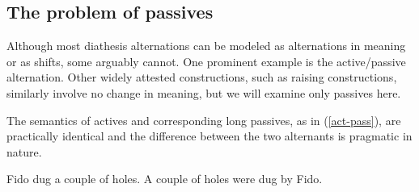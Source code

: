 \documentclass[output=paper
 	        ,biblatex
                ,babelshorthands
                ,newtxmath
                ,draftmode
                ,colorlinks, citecolor=brown
]{langscibook}
\begin{document}
\begin{exe}
	\ex\label{carve-sem}
	\begin{xlist}
	\ex \label{carve-sem-a}
\ex \label{carve-sem-b}
\end{xlist}
\end{exe}

 
\subsection{The problem of passives}
\label{passives}\label{arg-st:sec-passives}
Although most diathesis alternations can be modeled as alternations in meaning or as  shifts, some arguably cannot. 
One prominent example is the active/passive alternation.
Other widely attested constructions, such as raising constructions, similarly involve no change in meaning, but we will examine only passives here. 

The semantics of actives and corresponding long passives, as in (\ref{act-pass}), are practically identical and the difference between the two alternants is pragmatic in nature. 

\begin{exe}
	\ex\label{act-pass}
	\begin{xlist}
		\ex\label{act-pass-a}Fido dug a couple of holes.
		\ex\label{act-pass-b}A couple of holes were dug by Fido.
	\end{xlist}
\end{exe}
\end{document}

